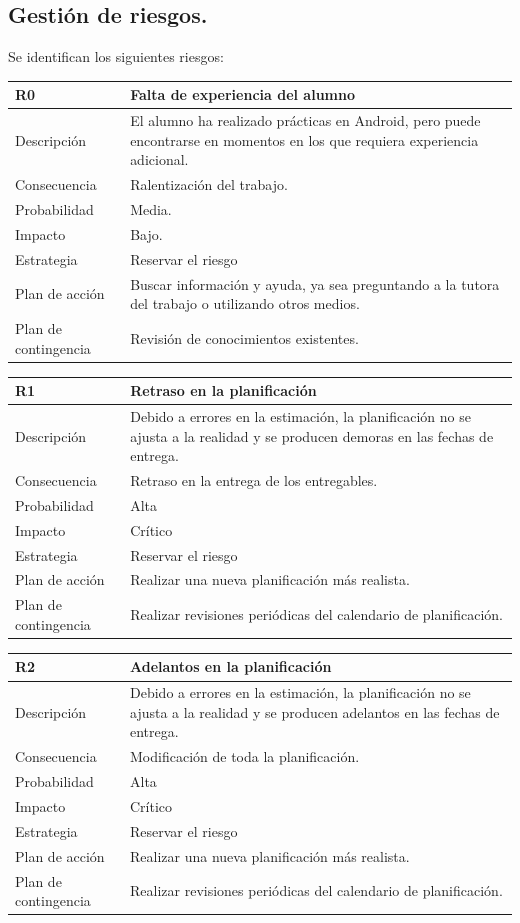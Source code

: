 \documentclass[twoside]{report}
\newcommand\addrow[2]{#1 &#2\\ }
\newcommand\addheading[2]{#1 &#2\\ \hline}
\newcommand\tabularhead{\begin{tabular}{lp{0.7\textwidth}}
\hline
}
\newenvironment{risk}{\tabularhead}
{\hline\end{tabular}}
\begin{document}
\subsection{Gestión de riesgos.}

Se identifican los siguientes riesgos:

\begin{risk}
  \addheading{R0}{Falta de experiencia del alumno}
  \addrow{Descripción}{El alumno ha realizado prácticas en Android, pero puede encontrarse en momentos en los que requiera experiencia adicional.}
  \addrow{Consecuencia}{Ralentización del trabajo.}
  \addrow{Probabilidad}{Media.}
  \addrow{Impacto}{Bajo.}
  \addrow{Estrategia}{Reservar el riesgo}
  \addrow{Plan de acción}{Buscar información y ayuda, ya sea preguntando a la tutora del trabajo o utilizando otros medios.}
  \addrow{Plan de contingencia}{Revisión de conocimientos existentes.}
\end{risk}

\vspace{0.5cm}

\begin{risk}
  \addheading{R1}{Retraso en la planificación}
  \addrow{Descripción}{Debido a errores en la estimación, la planificación no se ajusta a la realidad y se producen demoras en las fechas de entrega.}
  \addrow{Consecuencia}{Retraso en la entrega de los entregables.}
  \addrow{Probabilidad}{Alta }
  \addrow{Impacto}{Crítico}
  \addrow{Estrategia}{Reservar el riesgo}
  \addrow{Plan de acción}{Realizar una nueva planificación más realista. }
  \addrow{Plan de contingencia}{Realizar revisiones periódicas del calendario de planificación.}
\end{risk}

\vspace{0.5cm}

\begin{risk}
  \addheading{R2}{Adelantos en la planificación}
  \addrow{Descripción}{Debido a errores en la estimación, la planificación no se ajusta a la realidad y se producen adelantos en las fechas de entrega.}
  \addrow{Consecuencia}{Modificación de toda la planificación.}
  \addrow{Probabilidad}{Alta }
  \addrow{Impacto}{Crítico}
  \addrow{Estrategia}{Reservar el riesgo}
  \addrow{Plan de acción}{Realizar una nueva planificación más realista. }
  \addrow{Plan de contingencia}{Realizar revisiones periódicas del calendario de planificación.}
\end{risk}

\vspace{0.5cm}
\end{document}
